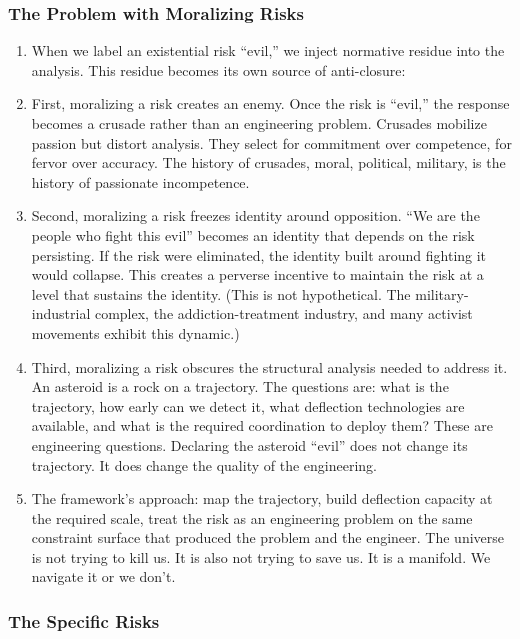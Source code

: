 \documentclass[
]{article}
\begin{document}
\subsubsection{The Problem with Moralizing
Risks}\label{the-problem-with-moralizing-risks}

\begin{enumerate}
\def\labelenumi{\arabic{enumi}.}
\setcounter{enumi}{216}
\item
  When we label an existential risk ``evil,'' we inject normative
  residue into the analysis. This residue becomes its own source of
  anti-closure:
\item
  First, moralizing a risk creates an enemy. Once the risk is ``evil,''
  the response becomes a crusade rather than an engineering problem.
  Crusades mobilize passion but distort analysis. They select for
  commitment over competence, for fervor over accuracy. The history of
  crusades, moral, political, military, is the history of passionate
  incompetence.
\item
  Second, moralizing a risk freezes identity around opposition. ``We are
  the people who fight this evil'' becomes an identity that depends on
  the risk persisting. If the risk were eliminated, the identity built
  around fighting it would collapse. This creates a perverse incentive
  to maintain the risk at a level that sustains the identity. (This is
  not hypothetical. The military-industrial complex, the
  addiction-treatment industry, and many activist movements exhibit this
  dynamic.)
\item
  Third, moralizing a risk obscures the structural analysis needed to
  address it. An asteroid is a rock on a trajectory. The questions are:
  what is the trajectory, how early can we detect it, what deflection
  technologies are available, and what is the required coordination to
  deploy them? These are engineering questions. Declaring the asteroid
  ``evil'' does not change its trajectory. It does change the quality of
  the engineering.
\item
  The framework's approach: map the trajectory, build deflection
  capacity at the required scale, treat the risk as an engineering
  problem on the same constraint surface that produced the problem and
  the engineer. The universe is not trying to kill us. It is also not
  trying to save us. It is a manifold. We navigate it or we don't.
\end{enumerate}

\subsubsection{The Specific Risks}\label{the-specific-risks}
\end{document}
